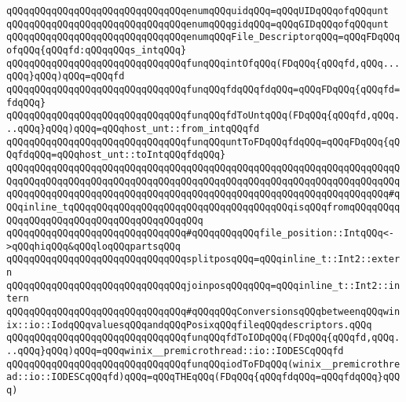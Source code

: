 \verb|qQQqqQQqqQQqqQQqqQQqqQQqqQQqqQQqenumqQQquidqQQq=qQQqUIDqQQqofqQQqunt|\newline
\verb|qQQqqQQqqQQqqQQqqQQqqQQqqQQqqQQqenumqQQqgidqQQq=qQQqGIDqQQqofqQQqunt|\newline
\newline
\verb|qQQqqQQqqQQqqQQqqQQqqQQqqQQqqQQqenumqQQqFile_DescriptorqQQq=qQQqFDqQQqofqQQq{qQQqfd:qQQqqQQqs_intqQQq}|\newline
\verb|qQQqqQQqqQQqqQQqqQQqqQQqqQQqqQQqfunqQQqintOfqQQq(FDqQQq{qQQqfd,qQQq...qQQq}qQQq)qQQq=qQQqfd|\newline
\verb|qQQqqQQqqQQqqQQqqQQqqQQqqQQqqQQqfunqQQqfdqQQqfdqQQq=qQQqFDqQQq{qQQqfd=fdqQQq}|\newline
\verb|qQQqqQQqqQQqqQQqqQQqqQQqqQQqqQQqfunqQQqfdToUntqQQq(FDqQQq{qQQqfd,qQQq...qQQq}qQQq)qQQq=qQQqhost_unt::from_intqQQqfd|\newline
\verb|qQQqqQQqqQQqqQQqqQQqqQQqqQQqqQQqfunqQQquntToFDqQQqfdqQQq=qQQqFDqQQq{qQQqfdqQQq=qQQqhost_unt::toIntqQQqfdqQQq}|\newline
\newline
\verb|qQQqqQQqqQQqqQQqqQQqqQQqqQQqqQQqqQQqqQQqqQQqqQQqqQQqqQQqqQQqqQQqqQQqqQQqqQQqqQQqqQQqqQQqqQQqqQQqqQQqqQQqqQQqqQQqqQQqqQQqqQQqqQQqqQQqqQQqqQQqqQQqqQQqqQQqqQQqqQQqqQQqqQQqqQQqqQQqqQQqqQQqqQQqqQQqqQQqqQQqqQQqqQQq#qQQqinline_tqQQqqQQqqQQqqQQqqQQqqQQqqQQqqQQqqQQqqQQqisqQQqfromqQQqqQQqqQQq|\verb|qQQqqQQqqQQqqQQqqQQqqQQqqQQqqQQq|\newline
\verb|qQQqqQQqqQQqqQQqqQQqqQQqqQQqqQQq#qQQqqQQqqQQqfile_position::IntqQQq<->qQQqhiqQQq&qQQqloqQQqpartsqQQq|\newline
\verb|qQQqqQQqqQQqqQQqqQQqqQQqqQQqqQQqsplitposqQQq=qQQqinline_t::Int2::extern|\newline
\verb|qQQqqQQqqQQqqQQqqQQqqQQqqQQqqQQqjoinposqQQqqQQq=qQQqinline_t::Int2::intern|\newline
\newline
\verb|qQQqqQQqqQQqqQQqqQQqqQQqqQQqqQQq#qQQqqQQqConversionsqQQqbetweenqQQqwinix::io::IodqQQqvaluesqQQqandqQQqPosixqQQqfileqQQqdescriptors.qQQq|\newline
\verb|qQQqqQQqqQQqqQQqqQQqqQQqqQQqqQQqfunqQQqfdToIODqQQq(FDqQQq{qQQqfd,qQQq...qQQq}qQQq)qQQq=qQQqwinix__premicrothread::io::IODESCqQQqfd|\newline
\verb|qQQqqQQqqQQqqQQqqQQqqQQqqQQqqQQqfunqQQqiodToFDqQQq(winix__premicrothread::io::IODESCqQQqfd)qQQq=qQQqTHEqQQq(FDqQQq{qQQqfdqQQq=qQQqfdqQQq}qQQq)|\newline
